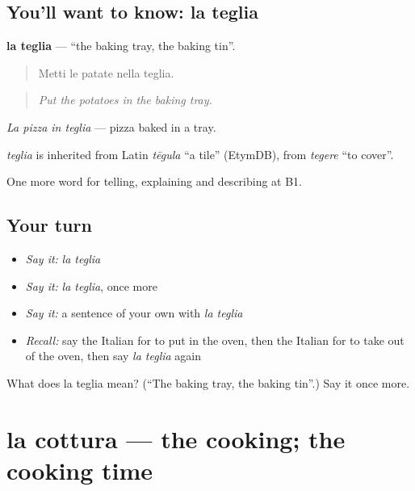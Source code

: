 \subsection*{You'll want to know: la teglia}
\textbf{la teglia} — \textquotedblleft{}the baking tray, the baking tin\textquotedblright{}.

\begin{quote}
Metti le patate nella teglia.
\end{quote}

\begin{quote}
\emph{Put the potatoes in the baking tray.}
\end{quote}

\emph{La pizza in teglia} — pizza baked in a tray.

\begin{cousinweb}
\emph{teglia} is inherited from Latin \emph{tēgula} \textquotedblleft{}a tile\textquotedblright{} (EtymDB), from \emph{tegere} \textquotedblleft{}to cover\textquotedblright{}.
\end{cousinweb}

\begin{grammarlens}[title={What you've built}]
One more word for telling, explaining and describing at B1.
\end{grammarlens}

\subsection*{Your turn}
\begin{itemize}
\raggedright
  \item \emph{Say it:} \emph{la teglia}
  \item \emph{Say it:} \emph{la teglia}, once more
  \item \emph{Say it:} a sentence of your own with \emph{la teglia}
  \item \emph{Recall:} say the Italian for to put in the oven, then the Italian for to take out of the oven, then say \emph{la teglia} again
\end{itemize}

\begin{tcolorbox}[breakable,colback=teal!4,colframe=teal!35!black,title={Before you move on}]
What does la teglia mean? (\textquotedblleft{}The baking tray, the baking tin\textquotedblright{}.) Say it once more.
\end{tcolorbox}
\section[la cottura]{la cottura — the cooking; the cooking time}

